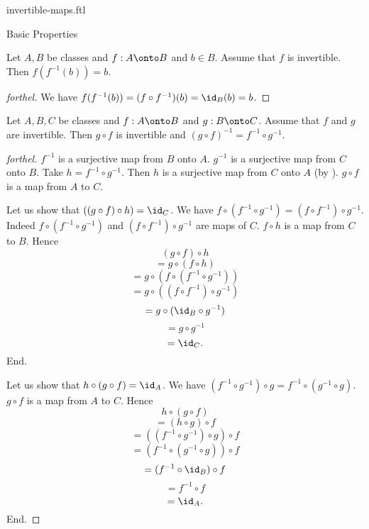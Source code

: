 \documentclass{naproche-library}
\begin{document}
\begin{smodule}[title=Invertible Maps]{invertible-maps.ftl}
\begin{sfragment}{Basic Properties}
  \begin{proposition}[forthel,id=FOUNDATIONS_09_6093864386712935]
    Let $A, B$ be classes and $f : A \onto B$ and $b \in B$.
    Assume that $f$ is invertible.
    Then $f(f^{-1}(b)) = b$.
  \end{proposition}
  \begin{proof}[forthel]
    We have
    $f(f^{-1}(b))
      = (f \circ f^{-1})(b)
      = \id_{B}(b)
      = b$.
  \end{proof}

  \begin{proposition}[forthel,id=FOUNDATIONS_09_7619151963095040]
    Let $A, B, C$ be classes and $f : A \onto B$ and $g : B \onto C$.
    Assume that $f$ and $g$ are invertible.
    Then $g \circ f$ is invertible and $(g \circ f)^{-1} = f^{-1} \circ g^{-1}$.
  \end{proposition}
  \begin{proof}[forthel]
    $f^{-1}$ is a surjective map from $B$ onto $A$.
    $g^{-1}$ is a surjective map from $C$ onto $B$.
    Take $h = f^{-1} \circ g^{-1}$.
    Then $h$ is a surjective map from $C$ onto $A$ (by ).
    $g \circ f$ is a map from $A$ to $C$.

    Let us show that $((g \circ f) \circ h) = \id_{C}$.
      We have $f \circ (f^{-1} \circ g^{-1}) = (f \circ f^{-1}) \circ g^{-1}$.
      Indeed $f \circ (f^{-1} \circ g^{-1})$ and $(f \circ f^{-1}) \circ g^{-1}$ are maps of $C$.
      $f \circ h$ is a map from $C$ to $B$.
      Hence
      \[  (g \circ f) \circ h                           \]
      \[    = g \circ (f \circ h)                       \]
      \[    = g \circ (f \circ (f^{-1} \circ g^{-1}))   \]
      \[    = g \circ ((f \circ f^{-1}) \circ g^{-1})   \]
      \[    = g \circ (\id_{B} \circ g^{-1})            \]
      \[    = g \circ g^{-1}                            \]
      \[    = \id_{C}.                                  \]
    End.

    Let us show that $h \circ (g \circ f) = \id_{A}$.
      We have $(f^{-1} \circ g^{-1}) \circ g = f^{-1} \circ (g^{-1} \circ g)$.
      $g \circ f$ is a map from $A$ to $C$.
      Hence
      \[  h \circ (g \circ f)                           \]
      \[    = (h \circ g) \circ f                       \]
      \[    = ((f^{-1} \circ g^{-1}) \circ g) \circ f   \]
      \[    = (f^{-1} \circ (g^{-1} \circ g)) \circ f   \]
      \[    = (f^{-1} \circ \id_{B}) \circ f            \]
      \[    = f^{-1} \circ f                            \]
      \[    = \id_{A}.                                  \]
    End.


\end{proof}
\end{sfragment}
\end{smodule}
\end{document}
